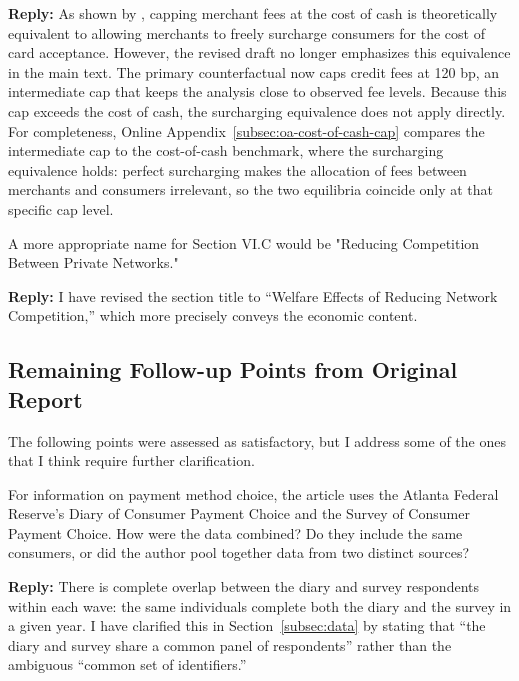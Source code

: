 \documentclass[main.tex]{subfiles}
\begin{document}
\begin{refsection}
\textbf{Reply:} As shown by \textcite{Zenger2011}, capping merchant fees at the cost of cash is theoretically equivalent to allowing merchants to freely surcharge consumers for the cost of card acceptance.
However, the revised draft no longer emphasizes this equivalence in the main text.
The primary counterfactual now caps credit fees at 120 bp, an intermediate cap that keeps the analysis close to observed fee levels.
Because this cap exceeds the cost of cash, the surcharging equivalence does not apply directly.
For completeness, Online Appendix~\ref{subsec:oa-cost-of-cash-cap} compares the intermediate cap to the cost-of-cash benchmark, where the surcharging equivalence holds: perfect surcharging makes the allocation of fees between merchants and consumers irrelevant, so the two equilibria coincide only at that specific cap level.

\begin{refcommentnoclear}
A more appropriate name for Section VI.C would be "Reducing Competition Between Private Networks."

\end{refcommentnoclear}

\textbf{Reply:} I have revised the section title to ``Welfare Effects of Reducing Network Competition,'' which more precisely conveys the economic content.

\subsection*{Remaining Follow-up Points from Original Report}

The following points were assessed as satisfactory, but I address some of the ones that I think require further clarification.

\begin{refcommentnoclear}
For information on payment method choice, the article uses the Atlanta Federal Reserve's Diary of Consumer Payment Choice and the Survey of Consumer Payment Choice.
How were the data combined?
Do they include the same consumers, or did the author pool together data from two distinct sources?
\end{refcommentnoclear}

\textbf{Reply:} There is complete overlap between the diary and survey respondents within each wave: the same individuals complete both the diary and the survey in a given year.
I have clarified this in Section~\ref{subsec:data} by stating that ``the diary and survey share a common panel of respondents'' rather than the ambiguous ``common set of identifiers.''


\end{refsection}
\end{document}
